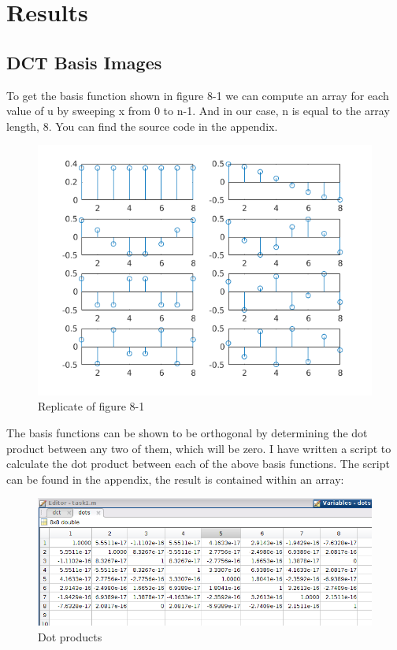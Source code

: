 \section{Results}

\subsection{DCT Basis Images}

To get the basis function shown in figure 8-1 we can compute an array for each
value of u by sweeping x from 0 to n-1. And in our case, n is equal to the array
length, 8. You can find the source code in the appendix.

\begin{figure}[H]
    \centering
    \includegraphics{dct_basis_1d.png}
    \caption{Replicate of figure 8-1}
\end{figure}

The basis functions can be shown to be orthogonal by determining the dot product
between any two of them, which will be zero. I have written a script to
calculate the dot product between each of the above basis functions. The script
can be found in the appendix, the result is contained within an array:

\begin{figure}[H]
    \centering
    \includegraphics[scale=0.5]{dot.png}
    \caption{Dot products}
\end{figure}

